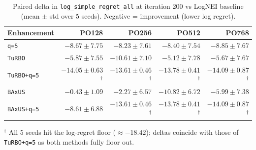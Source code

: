 \begin{table}[h]
\centering
\caption{Paired delta in \texttt{log\_simple\_regret\_all} at iteration 200 vs LogNEI baseline (mean $\pm$ std over 5 seeds). Negative = improvement (lower log regret).}
\label{tab:po_deltas}
\begin{tabular}{lrrrr}
\toprule
\textbf{Enhancement} & \textbf{PO128} & \textbf{PO256} & \textbf{PO512} & \textbf{PO768} \\
\midrule
\texttt{q=5} & $-8.67 \pm 7.75$ & $-8.23 \pm 7.61$ & $-8.40 \pm 7.54$ & $-8.85 \pm 7.67$ \\
\texttt{TuRBO} & $-5.87 \pm 7.55$ & $-10.61 \pm 7.10$ & $-5.12 \pm 7.78$ & $-5.67 \pm 7.67$ \\
\texttt{TuRBO+q=5} & $-14.05 \pm 0.63$$^\dagger$ & $-13.61 \pm 0.46$$^\dagger$ & $-13.78 \pm 0.41$$^\dagger$ & $-14.09 \pm 0.87$$^\dagger$ \\
\texttt{BAxUS} & $-0.43 \pm 1.09$ & $-2.27 \pm 6.57$ & $-10.82 \pm 6.72$ & $-5.99 \pm 7.38$ \\
\texttt{BAxUS+q=5} & $-8.61 \pm 6.88$ & $-13.61 \pm 0.46$$^\dagger$ & $-13.78 \pm 0.41$$^\dagger$ & $-14.09 \pm 0.87$$^\dagger$ \\
\bottomrule
\end{tabular}
\vspace{0.5em}
{\footnotesize $^\dagger$ All 5 seeds hit the log-regret floor ($\approx -18.42$); deltas coincide with those of \texttt{TuRBO+q=5} as both methods fully floor out.}
\end{table}